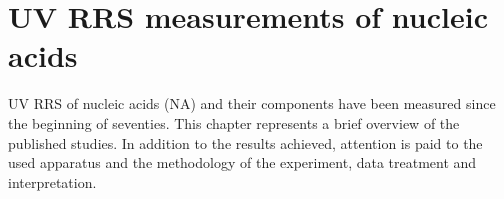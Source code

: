 \chapter{UV RRS measurements of nucleic acids}

UV RRS of nucleic acids (NA) and their components have been measured since the
beginning of seventies.
This chapter represents a brief overview of the published studies.
In addition to the results achieved, attention is paid to the used apparatus
and the methodology of the experiment, data treatment and interpretation.






